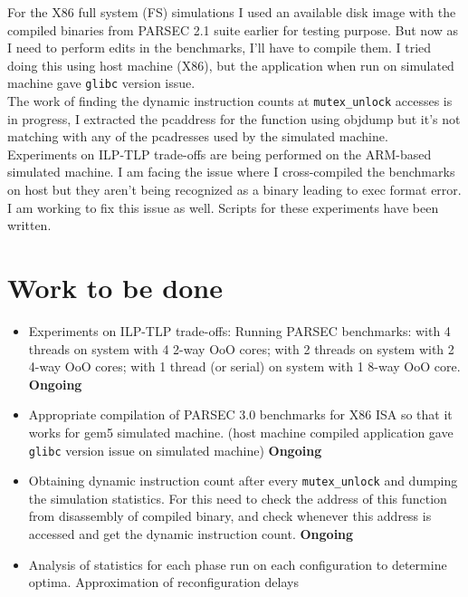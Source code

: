 \documentclass[a4paper,12pt, final]{report}
\begin{document}
\indent For the X86 full system (FS) simulations I used an available disk image with the compiled binaries from PARSEC 2.1 suite earlier for testing purpose. But now as I need to perform edits in the benchmarks, I'll have to compile them. I tried doing this using host machine (X86), but the application when run on simulated machine gave \texttt{glibc} version issue. \\
\indent The work of finding the dynamic instruction counts at \texttt{mutex\_unlock} accesses is in progress, I extracted the pcaddress for the function using objdump but it's not matching with any of the pcadresses used by the simulated machine. \\
Experiments on ILP-TLP trade-offs are being performed on the ARM-based simulated machine. I am facing the issue where I cross-compiled the benchmarks on host but they aren't being recognized as a binary leading to exec format error. I am working to fix this issue as well. Scripts for these experiments have been written.  
\section{Work to be done}
\begin{itemize}
   \item Experiments on ILP-TLP trade-offs: Running PARSEC benchmarks: with 4 threads on system with 4 2-way OoO cores; with 2 threads on system with 2 4-way OoO cores; with 1 thread (or serial) on system with 1 8-way OoO core. \textbf{Ongoing}
    \item Appropriate compilation of PARSEC 3.0 benchmarks for X86 ISA so that it works for gem5 simulated machine. (host machine compiled application gave \texttt{glibc} version issue on simulated machine) \textbf{Ongoing}
   \item Obtaining dynamic instruction count after every \texttt{mutex\_unlock} and dumping the simulation statistics. For this need to check the address of this function from disassembly of compiled binary, and check whenever this address is accessed and get the dynamic instruction count. \textbf{Ongoing}
    \item Analysis of statistics for each phase run on each configuration to determine optima. Approximation of reconfiguration delays
\end{itemize}

{}
\end{document}

